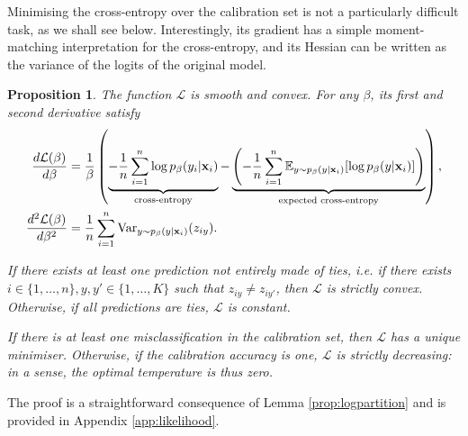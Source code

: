 \documentclass[10pt,dvipsnames]{article}
\newcommand{\bx}{\mathbf{x}}%
\theoremstyle{plain}
\newtheorem{proposition}{Proposition}
\theoremstyle{definition}
\theoremstyle{remark}
\begin{document}
Minimising the cross-entropy over the calibration set is not a particularly difficult task, as we shall see below. Interestingly, its gradient has a simple moment-matching interpretation for the cross-entropy, and its Hessian can be written as the variance of the logits of the original model.

\begin{proposition}
\label{prop:likelihood}
	The function $\mathcal{L}$ is smooth and convex. For any $\beta$, its first and second derivative satisfy
	\begin{align}
		\label{eq:grad-hess}
		 \frac{d \mathcal{L}(\beta)}{d\beta} &=\frac{1}{\beta} \left( \underbrace{-\frac{1}{n} \sum_{i=1}^n  \log p_\beta (y_i | \bx_i)}_\textup{cross-entropy}  -  \underbrace{\left(-\frac{1}{n} \sum_{i=1}^n\mathbb{E}_{y \sim p_\beta(y | \bx_i)} [ \log p_\beta(y |\bx_i)]\right)} _\textup{expected cross-entropy}\right),\\
    \frac{d^2 \mathcal{L} (\beta)}{d\beta^2}  &= \frac{1}{n} \sum_{i=1}^n \textup{Var}_{y \sim p_\beta(y | \bx_i)} ( z_{iy} ).
    \end{align}    
    
	If there exists at least one prediction not entirely made of ties, i.e. if there exists $i \in \{1, \ldots, n\}, y,y' \in \{1, \ldots, K\}$ such that $z_{iy} \neq z_{iy'}$, then $\mathcal{L}$ is strictly convex. Otherwise, if all predictions are ties, $\mathcal{L}$ is constant.
	
	
	If there is at least one misclassification in the calibration set, then  $\mathcal{L}$ has a unique minimiser. Otherwise, if the calibration accuracy is one, $\mathcal{L}$ is strictly decreasing: in a sense, the optimal temperature is thus zero. 
\end{proposition}
The proof is a straightforward consequence of Lemma \ref{prop:logpartition} and is provided in Appendix \ref{app:likelihood}.
\end{document}
